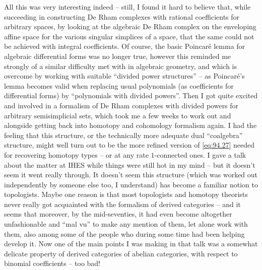 All this was very interesting indeed -- still, I found it hard to
believe that, while succeeding in constructing De Rham complexes with
rational coefficients for arbitrary spaces, by looking at the
algebraic De Rham complex on the enveloping affine space for the
various singular simplices of a space, that the same could not be
achieved with integral coefficients. Of course, the basic Poincaré
lemma for algebraic differential forms was no longer true, however
this reminded me strongly of a similar difficulty met with in
algebraic geometry, and which is overcome by working with suitable
``divided power structures'' -- as Poincaré's lemma becomes valid when
replacing usual polynomials (as coefficients for differential forms)
by ``polynomials with divided powers''. Then I got quite excited and
involved in a formalism of De Rham complexes with divided powers
for arbitrary semisimplicial sets, which took me a few
weeks to work out and alongside getting back into homotopy and
cohomology formalism again. I had the feeling that this structure, or
the technically more adequate dual ``coalgebra'' structure, might well
turn out to be the more refined version of \eqref{eq:94.27} needed for
recovering homotopy types -- or at any rate $1$-connected ones. I gave
a talk about the matter at IHES while things were still hot in my mind
-- but it doesn't seem it went really through. It doesn't seem this
structure (which was worked out independently by someone else too, I
understand) has become a familiar notion to
topologists. Maybe
one reason is that most topologists and homotopy theorists never
really got acquainted with the formalism of derived categories -- and
it seems that moreover, by the mid-seventies, it had even become
altogether unfashionable and ``mal vu'' to make any mention of them,
let alone work with them, also among some of the people who during
some time had been helping develop it. Now one of the main points I
was making in that talk was a somewhat delicate property of derived
categories of abelian categories, with respect to binomial
coefficients -- too bad!

